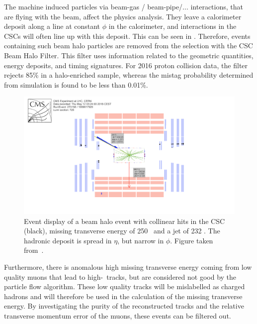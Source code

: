 The machine induced particles via beam-gas / beam-pipe/... interactions, that are flying with the beam, affect the physics analysis. They leave a calorimeter deposit along a line at constant $\phi$ in the calorimeter, and interactions in the CSCs will often line up with this deposit. This can be seen in . Therefore, events containing such beam halo particles are removed from the selection with the CSC Beam Halo Filter. This filter uses information related to the geometric quantities, energy deposits, and timing signatures. For 2016 proton collision data, the filter rejects 85\% in a halo-enriched sample, whereas the mistag probability determined from simulation is found to  be less than 0.01\%.  
\begin{figure}[htbp]
	\centering
	\includegraphics[width=1.\linewidth]{5_EventSelection/Figures/Figure_004}
	\caption{Event display of a beam halo event with collinear hits in the CSC (black), missing transverse energy of 250 \GeV\, and a jet of 232 \GeV. The hadronic deposit is spread in $\eta$, but narrow in $\phi$. Figure taken from~\cite{CMS-PAS-JME-16-004}. }
	\label{fig:beamhalo}
\end{figure}

Furthermore, there is anomalous high missing transverse energy coming from low quality muons that lead to high-\pt\ tracks, but are considered not good by the particle flow algorithm. These low quality tracks will be  mislabelled as charged hadrons and will therefore be used in the calculation of the missing transverse energy. By investigating the purity of the reconstructed tracks and the relative transverse momentum error of the muons, these events can be filtered out. 




